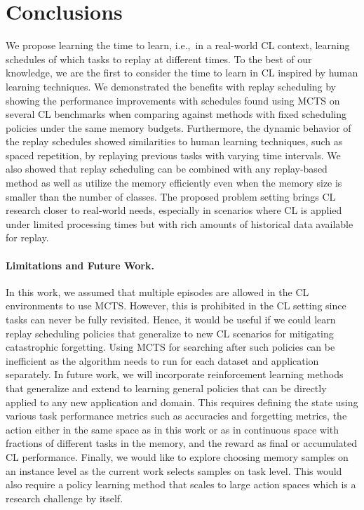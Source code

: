 
\section{Conclusions}\label{paperC:sec:conclusions}

We propose learning the time to learn, i.e.,~in a real-world CL context, learning schedules of which tasks to replay at different times. 
To the best of our knowledge, we are the first to consider the time to learn in CL inspired by human learning techniques. 
We demonstrated the benefits with replay scheduling by showing the performance improvements with schedules found using MCTS on several CL benchmarks when comparing against methods with fixed scheduling policies under the same memory budgets. Furthermore, the dynamic behavior of the replay schedules showed similarities to human learning techniques, such as spaced repetition, by replaying previous tasks with varying time intervals.  We also showed that replay scheduling can be combined with any replay-based method as well as utilize the memory efficiently even when the memory size is smaller than the number of classes. The proposed problem setting brings CL research closer to real-world needs, especially in scenarios where CL is applied under limited processing times but with rich amounts of historical data available for replay.

\vspace{-3mm}
\paragraph{Limitations and Future Work.}
In this work, we assumed that multiple episodes are allowed in the CL environments to use MCTS. However, this is prohibited in the CL setting since tasks can never be fully revisited.
Hence, it would be useful if we could learn replay scheduling policies that generalize to new CL scenarios for mitigating catastrophic forgetting. Using MCTS for searching after such policies can be inefficient as the algorithm needs to run for each dataset and application separately. In future work, we will incorporate reinforcement learning methods that generalize and extend to learning general policies that can be directly applied to any new application and domain. This requires defining the state using various task performance metrics such as accuracies and forgetting metrics, the action either in the same space as in this work or as in continuous space with fractions of different tasks in the memory, and the reward as final or accumulated CL performance. Finally, we would like to explore choosing memory samples on an instance level as the current work selects samples on task level. This would also require a policy learning method that scales to large action spaces which is a research challenge by itself. 


